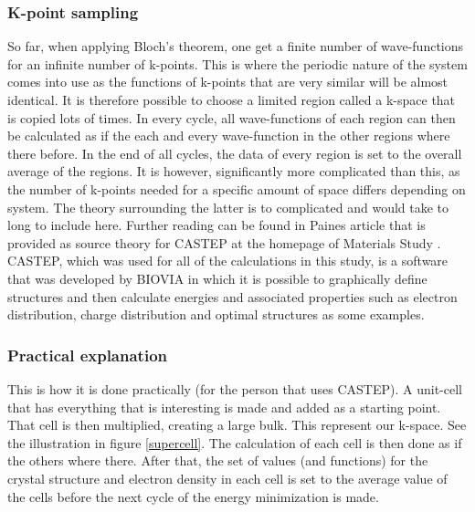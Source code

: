 \documentclass[12pt,a4paper]{article}
\begin{document}
\subsubsection{K-point sampling}
So far, when applying Bloch's theorem, one get a finite number of wave-functions for an infinite number of k-points. This is where the periodic nature of the system comes into use as the functions of k-points that are very similar will be almost identical. It is therefore possible to choose a limited region called a k-space that is copied lots of times. In every cycle, all wave-functions of each region can then be calculated as if the each and every wave-function in the other regions  where there before. In the end of all cycles, the data of every region is set to the overall average of the regions. It is however, significantly more complicated than this, as the number of k-points needed for a specific amount of space differs depending on system. The theory surrounding the latter is to complicated and would take to long to include here. Further reading can be found in Paines article that is provided as source theory for CASTEP at the homepage of Materials Study \cite{paine}. CASTEP, which was used for all of the calculations in this study, is a software that was developed by BIOVIA in which it is possible to graphically  define structures and then calculate energies and associated properties such as electron distribution, charge distribution and optimal structures as some examples. 

\subsubsection{Practical explanation}
This is how it is done practically (for the person that uses CASTEP). A unit-cell that has everything that is interesting is made and added as a starting point. That cell is then multiplied, creating a large bulk. This represent our k-space. See the illustration in figure \ref{supercell}. The calculation of each cell is then done as if the others where there. After that, the set of values (and functions) for the crystal structure and electron density in each cell is set to the average value of the cells before the next cycle of the energy minimization is made.
\end{document}
